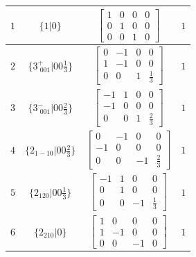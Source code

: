 \documentclass[fleqn,8pt]{jsarticle}
\begin{document}
\begin{longtable}{cccc}
$ 1 $ & $ \{1|0\} $ & $ \begin{bmatrix} 1 & 0 & 0 & 0 \\ 0 & 1 & 0 & 0 \\ 0 & 0 & 1 & 0 \end{bmatrix} $ & $ 1 $ \\ \hline
$ 2 $ & $ \{3^{+}_{\,\,001}|0 0 \frac{1}{3}\} $ & $ \begin{bmatrix} 0 & -1 & 0 & 0 \\ 1 & -1 & 0 & 0 \\ 0 & 0 & 1 & \frac{1}{3} \end{bmatrix} $ & $ 1 $ \\ \hline
$ 3 $ & $ \{3^{-}_{\,\,001}|0 0 \frac{2}{3}\} $ & $ \begin{bmatrix} -1 & 1 & 0 & 0 \\ -1 & 0 & 0 & 0 \\ 0 & 0 & 1 & \frac{2}{3} \end{bmatrix} $ & $ 1 $ \\ \hline
$ 4 $ & $ \{2{}_{1-10}|0 0 \frac{2}{3}\} $ & $ \begin{bmatrix} 0 & -1 & 0 & 0 \\ -1 & 0 & 0 & 0 \\ 0 & 0 & -1 & \frac{2}{3} \end{bmatrix} $ & $ 1 $ \\ \hline
$ 5 $ & $ \{2{}_{120}|0 0 \frac{1}{3}\} $ & $ \begin{bmatrix} -1 & 1 & 0 & 0 \\ 0 & 1 & 0 & 0 \\ 0 & 0 & -1 & \frac{1}{3} \end{bmatrix} $ & $ 1 $ \\ \hline
$ 6 $ & $ \{2{}_{210}|0\} $ & $ \begin{bmatrix} 1 & 0 & 0 & 0 \\ 1 & -1 & 0 & 0 \\ 0 & 0 & -1 & 0 \end{bmatrix} $ & $ 1 $ \\
\end{longtable}
\end{document}
